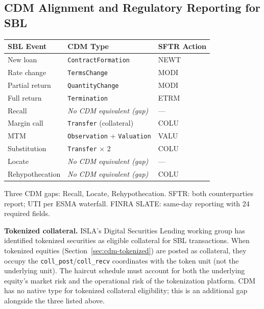 \documentclass[11pt,a4paper]{article}
\begin{document}
\subsection{CDM Alignment and Regulatory Reporting for SBL}
\label{sec:sbl-cdm}

\begin{center}
\small
\begin{tabular}{l l l}
\toprule
\textbf{SBL Event} & \textbf{CDM Type} & \textbf{SFTR Action} \\
\midrule
New loan & \texttt{ContractFormation} & NEWT \\
Rate change & \texttt{TermsChange} & MODI \\
Partial return & \texttt{QuantityChange} & MODI \\
Full return & \texttt{Termination} & ETRM \\
Recall & \emph{No CDM equivalent (gap)} & --- \\
Margin call & \texttt{Transfer} (collateral) & COLU \\
MTM & \texttt{Observation} + \texttt{Valuation} & VALU \\
Substitution & \texttt{Transfer} $\times$ 2 & COLU \\
Locate & \emph{No CDM equivalent (gap)} & --- \\
Rehypothecation & \emph{No CDM equivalent (gap)} & COLU \\
\bottomrule
\end{tabular}
\end{center}

Three CDM gaps: Recall, Locate, Rehypothecation. SFTR: both counterparties report; UTI per ESMA waterfall. FINRA SLATE: same-day reporting with 24 required fields.

\medskip
\noindent\textbf{Tokenized collateral.} ISLA's Digital Securities Lending working group has identified tokenized securities as eligible collateral for SBL transactions. When tokenized equities (Section~\ref{sec:cdm-tokenized}) are posted as collateral, they occupy the \texttt{coll\_post}/\texttt{coll\_recv} coordinates with the token unit (not the underlying unit). The haircut schedule must account for both the underlying equity's market risk and the operational risk of the tokenization platform. CDM has no native type for tokenized collateral eligibility; this is an additional gap alongside the three listed above.
\end{document}
